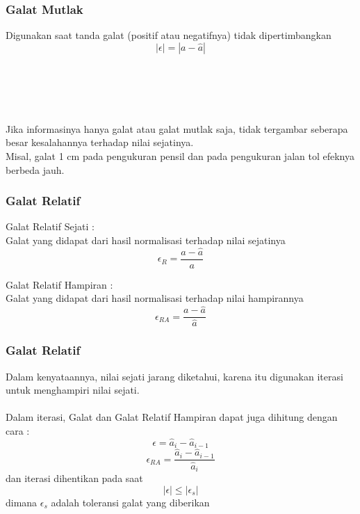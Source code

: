 \documentclass{beamer}
\begin{document}
\begin{frame}
\frametitle{Galat Mutlak}
Digunakan saat tanda galat (positif atau negatifnya) tidak dipertimbangkan
\begin{equation}
|\epsilon| = |a-\hat{a}|
\nonumber
\end{equation}
\ \\\ \\\ \\\ \\\ \\Jika informasinya hanya galat atau galat mutlak saja, tidak tergambar seberapa besar kesalahannya terhadap nilai sejatinya. 
\\Misal, galat 1 cm pada pengukuran pensil dan pada pengukuran jalan tol efeknya berbeda jauh.
\end{frame}


\begin{frame}
\frametitle{Galat Relatif}
Galat Relatif Sejati :
\\Galat yang didapat dari hasil normalisasi terhadap nilai sejatinya
\begin{equation}
\epsilon_R = \dfrac{a-\hat{a}}{a}
\nonumber
\end{equation}

Galat Relatif Hampiran :
\\Galat yang didapat dari hasil normalisasi terhadap nilai hampirannya
\begin{equation}
\epsilon_{RA} = \dfrac{a-\hat{a}}{\hat{a}}
\nonumber
\end{equation}
\end{frame}


\begin{frame}
\frametitle{Galat Relatif}
Dalam kenyataannya, nilai sejati jarang diketahui, karena itu digunakan iterasi untuk menghampiri nilai sejati. 
\\\ \\Dalam iterasi, Galat dan Galat Relatif Hampiran dapat juga dihitung dengan cara :
\begin{equation}
\epsilon = \hat{a}_{i}-\hat{a}_{i-1}
\nonumber
\end{equation}
\begin{equation}
\epsilon_{RA} = \dfrac{\hat{a}_{i}-\hat{a}_{i-1}}{\hat{a}_i}
\nonumber
\end{equation}
dan iterasi dihentikan pada saat 
\begin{equation}
|\epsilon| \leq |\epsilon_s|
\nonumber
\end{equation}
dimana $\epsilon_s$ adalah toleransi galat yang diberikan

\end{frame}
\end{document}

